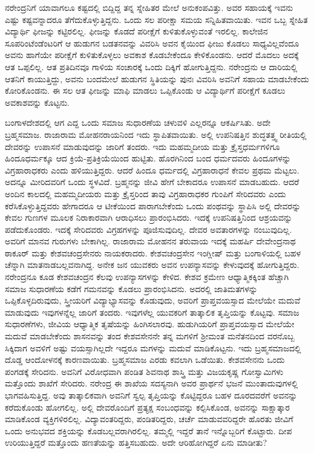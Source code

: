ನರೇಂದ್ರನಿಗೆ ಯಾವಾಗಲೂ ಕಷ್ಟದಲ್ಲಿ ಬಿದ್ದಿದ್ದ ತನ್ನ ಸ್ನೇಹಿತರ ಮೇಲೆ ಅನುಕಂಪವಿತ್ತು. ಅವರ ಸಹಾಯಕ್ಕೆ ಇವನು ಎಷ್ಟು ಕಷ್ಟವನ್ನಾದರೂ ತೆಗೆದುಕೊಳ್ಳುತ್ತಿದ್ದನು. ಒಂದು ಸಲ ಪರೀಕ್ಷಾ ಸಮಯ ಸನ್ನಿಹಿತವಾಯಿತು. ಇವನ ಒಬ್ಬ ಸ್ನೇಹಿತ ವಿದ್ಯಾರ್ಥಿ ಫೀಜನ್ನು ಕಟ್ಟಿರಲಿಲ್ಲ. ಫೀಜನ್ನು ಕೊಡದೆ ಪರೀಕ್ಷೆಗೆ ಕುಳಿತುಕೊಳ್ಳುವಂತೆ ಇರಲಿಲ್ಲ. ಕಾಲೇಜಿನ ಸೂಪರಿಂಟೆಂಡೆಂಟರಿಗೆ ಆ ಹುಡುಗನ ಬಡತನವನ್ನು ವಿವರಿಸಿ ಅವನ ಕೈಯಿಂದ ಫೀಜು ಕೊಡಲು ಸಾಧ್ಯವಿಲ್ಲವೆಂದೂ ಅವನು ಹಾಗೆಯೇ ಪರೀಕ್ಷೆಗೆ ಕುಳಿತುಕೊಳ್ಳಲು ಅವಕಾಶ ಕೊಡಬೇಕೆಂದೂ ಕೇಳಿಕೊಂಡನು. ಆದರೆ ಮೊದಲು ಅದಕ್ಕೆ ಆತ ಒಪ್ಪಲಿಲ್ಲ. ಆತ ಪ್ರತಿದಿನವೂ ಗಾಳಿಯ ಸಂಚಾರಕ್ಕೆ ಒಂದು ದಿಕ್ಕಿಗೆ ಹೋಗುತ್ತಿದ್ದನು. ನರೇಂದ್ರನು ಆ ದಾರಿಯಲ್ಲಿ ಆತನಿಗೆ ಕಾಯುತ್ತಿದ್ದು, ಅವನು ಬಂದಮೇಲೆ ಹುಡುಗನ ಸ್ಥಿತಿಯನ್ನು ಪುನಃ ವಿವರಿಸಿ ಅವನಿಗೆ ಸಹಾಯ ಮಾಡಬೇಕೆಂದು ಕೋರಿಕೊಂಡನು. ಈ ಸಲ ಆತ ಫೀಜನ್ನು ಮಾಫಿ ಮಾಡಲು ಒಪ್ಪಿಕೊಂಡು ಆ ವಿದ್ಯಾರ್ಥಿಗೆ ಪರೀಕ್ಷೆಗೆ ಕೂಡಲು ಅವಕಾಶವನ್ನು ಕೊಟ್ಟನು.

ಬಂಗಾಳದೇಶದಲ್ಲಿ ಆಗ ಎದ್ದ ಒಂದು ಸಮಾಜ ಸುಧಾರಣೆಯ ಚಳುವಳಿ ಎಲ್ಲರನ್ನೂ ಆಕರ್ಷಿಸಿತು. ಅದೇ ಬ್ರಹ್ಮಸಮಾಜ. ರಾಜಾರಾಮ ಮೋಹನರಾಯನಿಂದ ಇದು ಸ್ಥಾಪಿತವಾಯಿತು. ಅಲ್ಲಿ ಉಪನಿಷತ್ತಿನ ಶುದ್ಧತತ್ತ್ವ ರೀತಿಯಲ್ಲಿ ದೇವರನ್ನು ಉಪಾಸನೆ ಮಾಡುವುದನ್ನು ಜಾರಿಗೆ ತಂದರು. ಇದು ಮಹಮ್ಮದೀಯ ಮತ್ತು ಕ್ರೈಸ್ತಧರ್ಮಗಳಿಗೂ ಹಿಂದೂಧರ್ಮಕ್ಕೂ ಆದ ಕ್ರಿಯೆ-ಪ್ರತಿಕ್ರಿಯೆಯಿಂದ ಹುಟ್ಟಿತು. ಹೊರಗಿನಿಂದ ಬಂದ ಧರ್ಮದವರು ಹಿಂದೂಗಳನ್ನು ವಿಗ್ರಹಾರಾಧಕರು ಎಂದು ಹಳಿಯುತ್ತಿದ್ದರು. ಆದರೆ ಹಿಂದೂ ಧರ್ಮದಲ್ಲಿ ವಿಗ್ರಹಾರಾಧನೆ ಕೇವಲ ಪ್ರಥಮ ಮೆಟ್ಟಲು. ಅದನ್ನೂ ಮೀರಿದವರಿಗೆ ಒಂದು ಸ್ಥಳವಿದೆ. ಬ್ರಹ್ಮನನ್ನು ಜೀವಿ ಹೇಗೆ ಬೇಕಾದರೂ ಉಪಾಸನೆ ಮಾಡಬಹುದು. ಆದರೆ ಅಂದಿನ ಕಾಲದಲ್ಲಿ ಮಹಮ್ಮದೀಯರು ಮತ್ತು ಕ್ರೈಸ್ತರಿಂದ ತಾವು ವಿಗ್ರಹಾರಾಧಕರ ಗುಂಪಿಗೆ ಸೇರಿದವರು ಎಂದು ಕರೆಸಿಕೊಳ್ಳುತ್ತಿದ್ದವರು ಹೇಗಾದರೂ ಆ ಟೀಕೆಯಿಂದ ಪಾರಾಗಬೇಕೆಂದು ಒಂದು ಪಂಥವನ್ನು ಸ್ಥಾಪಿಸಿ ಅಲ್ಲಿ ದೇವರನ್ನು ಕೇವಲ ಗುಣಗಳ ಮೂಲಕ ನಿರಾಕಾರವಾಗಿ ಆರಾಧಿಸಲು ಪ್ರಾರಂಭಿಸಿದರು. ಇದಕ್ಕೆ ಉಪನಿಷತ್ತಿನಿಂದ ಆಶ್ರಯವನ್ನು ಪಡೆದುಕೊಂಡರು. ಇದಕ್ಕೆ ಸೇರಿದವರು ವಿಗ್ರಹಗಳನ್ನು ಪೂಜಿಸುವುದಿಲ್ಲ. ದೇವರ ಅವತಾರಗಳನ್ನು ನಂಬುವುದಿಲ್ಲ. ಅವರಿಗೆ ಮಾನವ ಗುರುಗಳು ಬೇಕಾಗಿಲ್ಲ. ರಾಜಾರಾಮ ಮೋಹನನ ತರುವಾಯ ಇದಕ್ಕೆ ಮಹರ್ಷಿ ದೇವೇಂದ್ರನಾಥ ಠಾಕೂರ್ ಮತ್ತು ಕೇಶವಚಂದ್ರಸೇನರು ನಾಯಕರಾದರು. ಕೇಶವಚಂದ್ರಸೇನ ಇಂಗ್ಲೀಷ್ ಮತ್ತು ಬಂಗಾಳಿಯಲ್ಲಿ ಬಹಳ ಚೆನ್ನಾಗಿ ಮಾತನಾಡಬಲ್ಲವನಾಗಿದ್ದ. ಅನೇಕ ಜನ ಯುವಕರು ಅವನ ಉಪನ್ಯಾಸವನ್ನು ಕೇಳುವುದಕ್ಕೆ ಹೋಗುತ್ತಿದ್ದರು. ನರೇಂದ್ರನೂ ಕೂಡ ಕೇಶವಚಂದ್ರನ ಕೆಲವು ಉಪನ್ಯಾಸಗಳನ್ನು ಕೇಳಿದ. ಕೇಶವ ಕ್ರಮೇಣ ಆಧ್ಯಾತ್ಮಿಕಕ್ಕಿಂತ ಹೆಚ್ಚಾಗಿ ಸಮಾಜ ಸುಧಾರಣೆಯ ಕಡೆಗೆ ಗಮನವನ್ನು ಕೊಡಲು ಪ್ರಾರಂಭಿಸಿದನು. ಅದರಲ್ಲಿ ಜಾತಿಮತಗಳನ್ನು ಒಪ್ಪಿಕೊಳ್ಳದಿರುವುದು, ಸ್ತ್ರೀಯರಿಗೆ ವಿದ್ಯಾಭ್ಯಾಸವನ್ನು ಕೊಡುವುದು, ಅವರಿಗೆ ಪ್ರಾಪ್ತವಯಸ್ಸಾದ ಮೇಲೆಯೇ ಮದುವೆ ಮಾಡುವುದು ಇವುಗಳನ್ನೆಲ್ಲ ಜಾರಿಗೆ ತಂದರು. ಇವುಗಳೆಲ್ಲ ಯುವಕರಿಗೆ ತಾತ್ಕಾಲಿಕ ತೃಪ್ತಿಯನ್ನು ಕೊಟ್ಟವು. ಸಮಾಜ ಸುಧಾರಣೆಗಳು, ಜೀವಿಯ ಆಧ್ಯಾತ್ಮಿಕ ತೃಷೆಯನ್ನು ಹಿಂಗಿಸಲಾರವು. ಹುಡುಗಿಯರಿಗೆ ಪ್ರಾಪ್ತವಯಸ್ಸಾದ ಮೇಲೆಯೇ ಮದುವೆ ಮಾಡಬೇಕೆಂದು ಶಾಸನವನ್ನು ತಂದ ಕೇಶವಸೇನನೇ ತನ್ನ ಮಗಳಿಗೆ ಶ‍್ರೀಮಂತ ಮನೆತನದಿಂದ ವರನೊಬ್ಬ ಸಿಕ್ಕಿದಾಗ ಅವಳಿಗೆ ಅಷ್ಟು ವಯಸ್ಸಾಗಿಲ್ಲದೇ ಇದ್ದರೂ ಮಗಳನ್ನು ಮದುವೆ ಮಾಡಿಕೊಟ್ಟನು. ಇದು ಬ್ರಹ್ಮಸಮಾಜದಲ್ಲಿ ದೊಡ್ಡ ಆಂದೋಳನಕ್ಕೆ ಕಾರಣವಾಯಿತು. ಬ್ರಹ್ಮಸಮಾಜ ಎರಡು ಕವಲಾಗಿ ಒಡೆಯಿತು. ಕೇಶವಸೇನನು ಒಂದು ಪಂಗಡಕ್ಕೆ ಸೇರಿದನು. ಅವನಿಗೆ ವಿರೋಧವಾಗಿ ಪಂಡಿತ ಶಿವನಾಥ ಶಾಸ್ತ್ರಿ ಮತ್ತು ವಿಜಯಕೃಷ್ಣ ಗೋಸ್ವಾಮಿಗಳು ಮತ್ತೊಂದು ಶಾಖೆಗೆ ಸೇರಿದರು. ನರೇಂದ್ರ ಈ ಶಾಖೆಯ ಸದಸ್ಯನಾಗಿ ಅವರ ಪ್ರಾರ್ಥನೆ ಭಜನೆ ಮುಂತಾದುವುಗಳಲ್ಲಿ ಭಾಗವಹಿಸುತ್ತಿದ್ದ. ಅವು ತಾತ್ಕಾಲಿಕವಾಗಿ ಅವನಿಗೆ ಸ್ವಲ್ಪ ತೃಪ್ತಿಯನ್ನು ಕೊಟ್ಟಿದ್ದರೂ ಬಹಳ ದೂರದವರೆಗೆ ಅವನನ್ನು ಕರೆದುಕೊಂಡು ಹೋಗಲಿಲ್ಲ. ಅಲ್ಲಿ ದೇವರೊಂದಿಗೆ ಪ್ರತ್ಯಕ್ಷ ಸಂಬಂಧವನ್ನು ಕಲ್ಪಿಸಿಕೊಂಡ, ಅವನನ್ನು ಸಾಕ್ಷಾತ್ಕಾರ ಮಾಡಿಕೊಂಡ ವ್ಯಕ್ತಿಗಳಿರಲಿಲ್ಲ. ವಿದ್ಯಾವಂತರಿದ್ದರು, ಪಂಡಿತರಿದ್ದರು, ಚರ್ಚೆ ಮಾಡುವವರಿದ್ದರೇ ಹೊರತು ಜೀವಿಗೆ ಒಂದು ಅನುಭವದ ಶಕ್ತಿಯನ್ನು ಕೊಡಬಲ್ಲವರಾಗಿರಲಿಲ್ಲ. ತಮ್ಮಲ್ಲಿ ಇದ್ದರೆ ತಾನೆ ಇನ್ನೊಬ್ಬರಿಗೆ ಕೊಟ್ಟಾರು. ದೀಪ ಉರಿಯುತ್ತಿದ್ದರೆ ಮತ್ತೊಂದು ಹಣತೆಯನ್ನು ಹತ್ತಿಸಬಹುದು. ಅದೇ ಆರಿಹೋಗಿದ್ದರೆ ಏನು ಮಾಡೀತು?

